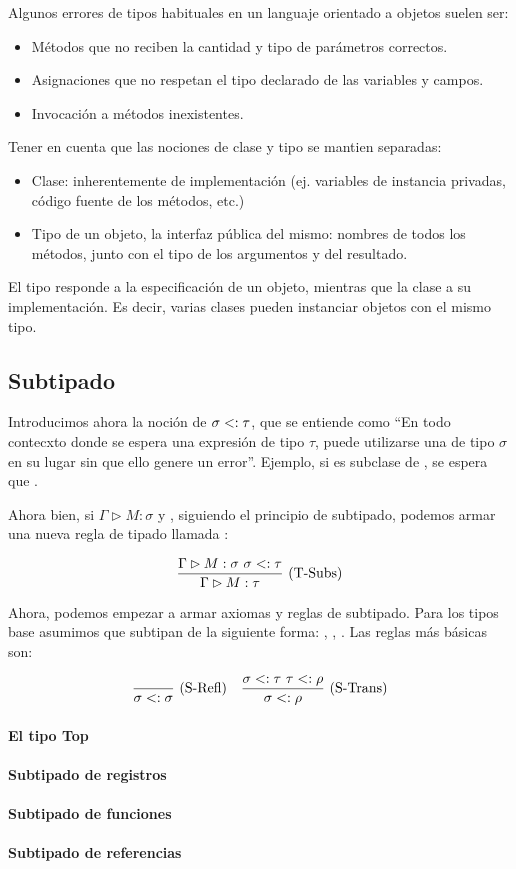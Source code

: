 Algunos errores de tipos habituales en un languaje orientado a objetos suelen ser:
\begin{itemize}
  \item Métodos que no reciben la cantidad y tipo de parámetros correctos.
  \item Asignaciones que no respetan el tipo declarado de las variables y campos.
  \item Invocación a métodos inexistentes.
\end{itemize}

Tener en cuenta que las nociones de clase y tipo se mantien separadas:
\begin{itemize}
  \item Clase: inherentemente de implementación (ej. variables de instancia privadas, código fuente de los métodos, etc.)
  \item Tipo de un objeto, la interfaz pública del mismo: nombres de todos los métodos, junto con el tipo de los argumentos y del resultado.
\end{itemize}

El tipo responde a la especificación de un objeto, mientras que la clase a su implementación. Es decir, varias clases pueden instanciar objetos con el mismo tipo.

\subsection{Subtipado}

Introducimos ahora la noción de  $\sigma <: \tau$, que se entiende como ``En todo contecxto donde se espera una expresión de tipo $\tau$, puede utilizarse una de tipo $\sigma$ en su lugar sin que ello genere un error''. Ejemplo, si  es subclase de , se espera que .

Ahora bien, si $\Gamma \rhd M : \sigma$ y \subt{\sigma}{\tau}, siguiendo el principio de subtipado, podemos armar una nueva regla de tipado llamada :

\[\deriv{\Gamma \rhd M : \sigma\ \subt{\sigma}{\tau}}{\Gamma \rhd M : \tau}{T-Subs}\]

Ahora, podemos empezar a armar axiomas y reglas de subtipado. Para los tipos base asumimos que subtipan de la siguiente forma: , , . Las reglas más básicas son:

\[\deriv{}{\subt{\sigma}{\sigma}}{S-Refl} \quad \deriv{\subt{\sigma}{\tau}\ \subt{\tau}{\rho}}{\subt{\sigma}{\rho}}{S-Trans}\]

\paragraph{El tipo Top}

\paragraph{Subtipado de registros}

\paragraph{Subtipado de funciones}

\paragraph{Subtipado de referencias}
